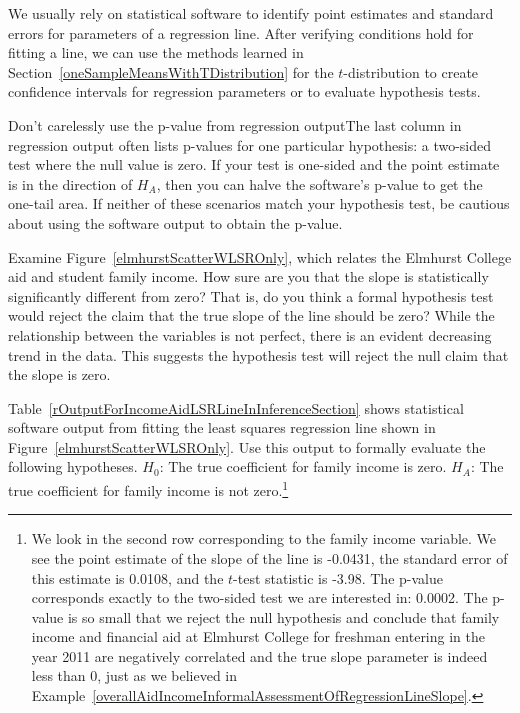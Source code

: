 \begin{termBox}{
We usually rely on statistical software to identify point estimates and standard errors for parameters of a regression line. After verifying conditions hold for fitting a line, we can use the methods learned in Section~\ref{oneSampleMeansWithTDistribution} for the $t$-distribution to create confidence intervals for regression parameters or to evaluate hypothesis tests.}
\end{termBox}

\begin{caution}{Don't carelessly use the p-value from regression output}{The last column in regression output often lists p-values for one particular hypothesis: a two-sided test where the null value is zero. If your test is one-sided and the point estimate is in the direction of $H_A$, then you can halve the software's p-value to get the one-tail area. If neither of these scenarios match your hypothesis test, be cautious about using the software output to obtain the p-value.}
\end{caution}

\begin{example}{Examine Figure~\vref{elmhurstScatterWLSROnly}, which relates the Elmhurst College aid and student family income. How sure are you that the slope is statistically significantly different from zero? That is, do you think a formal hypothesis test would reject the claim that the true slope of the line should be zero?} \label{overallAidIncomeInformalAssessmentOfRegressionLineSlope}
While the relationship between the variables is not perfect, there is an evident decreasing trend in the data. This suggests the hypothesis test will reject the null claim that the slope is zero.
\end{example}

\begin{exercise}
Table~\ref{rOutputForIncomeAidLSRLineInInferenceSection} shows statistical software output from fitting the least squares regression line shown in Figure~\ref{elmhurstScatterWLSROnly}. Use this output to formally evaluate the following hypotheses. $H_0$: The true coefficient for family income is zero. $H_A$: The true coefficient for family income is not zero.\footnote{We look in the second row corresponding to the family income variable. We see the point estimate of the slope of the line is -0.0431, the standard error of this estimate is 0.0108, and the $t$-test statistic is -3.98. The p-value corresponds exactly to the two-sided test we are interested in: 0.0002. The p-value is so small that we reject the null hypothesis and conclude that family income and financial aid at Elmhurst College for freshman entering in the year 2011 are negatively correlated and the true slope parameter is indeed less than 0, just as we believed in Example~\ref{overallAidIncomeInformalAssessmentOfRegressionLineSlope}.}
\end{exercise}

